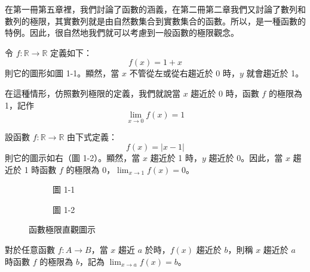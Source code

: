 在第一冊第五章裡，我們討論了函數的涵義，在第二冊第二章我們又討論了數列和數列的極限，其實數列就是由自然數集合到實數集合的函數。所以，是一種函數的特例。因此，很自然地我們就可以考慮到一般函數的極限觀念。

\begin{example}\label{ex:b6s-app4-1}
令 $f: \mathbb{R}\to\mathbb{R}$ 定義如下：
\[ f(x) = 1+x \]
則它的圖形如圖 1-1。顯然，當 $x$ 不管從左或從右趨近於 0 時，$y$ 就會趨近於 1。

在這種情形，仿照數列極限的定義，我們就說當 $x$ 趨近於 0 時，函數 $f$ 的極限為 1，記作
\[ \lim_{x\to 0} f(x) = 1 \]
\end{example}

\begin{example}\label{ex:b6s-app4-2}
設函數 $f: \mathbb{R}\to\mathbb{R}$ 由下式定義：
\[ f(x) = |x-1| \]
則它的圖示如右（圖 1-2）。顯然，當 $x$ 趨近於 1 時，$y$ 趨近於 0。因此，當 $x$ 趨近於 1 時函數 $f$ 的極限為 0，$\lim_{x\to 1} f(x) = 0$。
\end{example}

\begin{figure}[H]
\centering
\begin{subfigure}[b]{0.45\textwidth}
\centering
{}
\caption{圖 1-1}
\end{subfigure}
\begin{subfigure}[b]{0.45\textwidth}
\centering
{}
\caption{圖 1-2}
\end{subfigure}
\caption{函數極限直觀圖示}
\label{fig:b6s-app4-limit-intro}
\end{figure}

對於任意函數 $f: A\to B$，當 $x$ 趨近 $a$ 於時，$f(x)$ 趨近於 $b$，則稱 $x$ 趨近於 $a$ 時函數 $f$ 的極限為 $b$，記為 $\lim_{x\to a} f(x) = b$。

